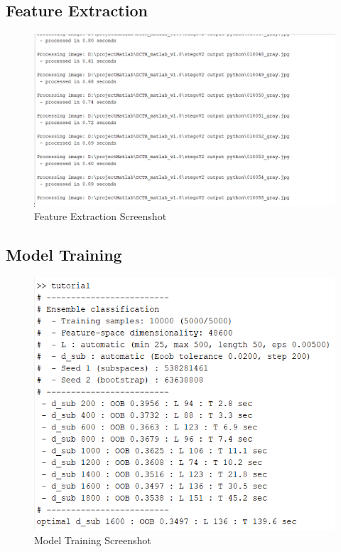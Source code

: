 \subsection{Feature Extraction}
\begin{figure}[H]
    \centering
    \includegraphics[width=150mm]{./img/feature_extraction.png}
    \caption{Feature Extraction Screenshot}
\end{figure}
\subsection{Model Training}
\begin{figure}[H]
    \centering
    \includegraphics[width=150mm]{./img/training.png}
    \caption{Model Training Screenshot}
\end{figure}